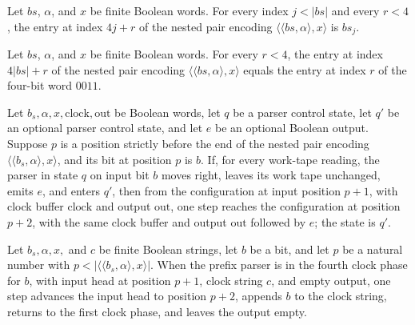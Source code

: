 \begin{lemma}
\label{Turing.timed_clock_get}
\leanok
{}
Let $bs$, $\alpha$, and $x$ be finite Boolean words. For every index $j<|bs|$ and every
$r<4$, the entry at index $4j+r$ of the nested pair encoding $\langle\langle
bs,\alpha\rangle,x\rangle$ is $bs_j$.
\end{lemma}

\begin{lemma}
\label{Turing.timed_clock_separator}
\leanok
{}
Let $bs$, $\alpha$, and $x$ be finite Boolean words. For every $r<4$, the entry at index
$4|bs|+r$ of the nested pair encoding $\langle\langle bs,\alpha\rangle,x\rangle$ equals
the entry at index $r$ of the four-bit word $0011$.
\end{lemma}

\begin{lemma}
\label{Turing.timedPrefix_advance}
\leanok
{}
Let $b_s,\alpha,x,\mathrm{clock},\mathrm{out}$ be Boolean words, let $q$ be a parser
control state, let $q'$ be an optional parser control state, and let $e$ be an optional
Boolean output. Suppose $p$ is a position strictly before the end of the nested pair
encoding $\langle\langle b_s,\alpha\rangle,x\rangle$, and its bit at position $p$ is
$b$. If, for every work-tape reading, the parser in state $q$ on input bit $b$ moves
right, leaves its work tape unchanged, emits $e$, and enters $q'$, then from the
configuration at input position $p+1$, with clock buffer $\mathrm{clock}$ and output
$\mathrm{out}$, one step reaches the configuration at position $p+2$, with the same
clock buffer and output $\mathrm{out}$ followed by $e$; the state is $q'$.
\end{lemma}

\begin{lemma}
\label{Turing.timedPrefix_write}
\leanok
{}
Let $b_s,\alpha,x,$ and $c$ be finite Boolean strings, let $b$ be a bit, and let $p$ be
a natural number with $p<|\langle\langle b_s,\alpha\rangle,x\rangle|$. When the prefix
parser is in the fourth clock phase for $b$, with input head at position $p+1$, clock
string $c$, and empty output, one step advances the input head to position $p+2$,
appends $b$ to the clock string, returns to the first clock phase, and leaves the output
empty.
\end{lemma}

